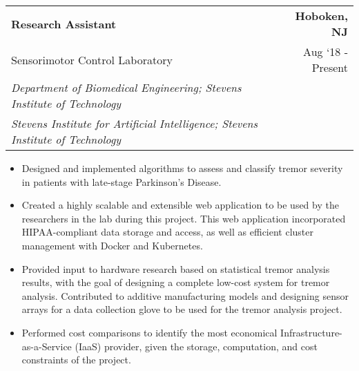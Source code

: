 \documentclass[10pt, letterpaper]{article}
\newcommand{\tabularxwidth}{\textwidth}
\begin{document}
    
    \begin{minipage}{\tabularxwidth}

        \begin{tabularx}{\tabularxwidth}{X r}
            \textbf{Research Assistant} & \textbf{Hoboken, 
        NJ} \\
            Sensorimotor Control Laboratory & 
        
    Aug ‘18 - Present \\
            
                
                    \textit{Department of Biomedical Engineering; Stevens Institute of Technology} & \\
                
                    \textit{Stevens Institute for Artificial Intelligence; Stevens Institute of Technology} & \\
                
            
            
        \end{tabularx}

        \begin{itemize}[noitemsep, topsep=3pt, parsep=0pt, partopsep=0pt]
            
                \item 
    Designed and implemented algorithms to assess and classify tremor severity in patients with late-stage Parkinson's Disease.
            
                \item 
    Created a highly scalable and extensible web application to be used by the researchers in the lab during this project. This web application incorporated HIPAA-compliant data storage and access, as well as efficient cluster management with Docker and Kubernetes.
            
                \item 
    Provided input to hardware research based on statistical tremor analysis results, with the goal of designing a complete low-cost system for tremor analysis. Contributed to additive manufacturing models and designing sensor arrays for a data collection glove to be used for the tremor analysis project.
            
                \item 
    Performed cost comparisons to identify the most economical Infrastructure-as-a-Service (IaaS) provider, given the storage, computation, and cost constraints of the project.
            
        \end{itemize}

        
            \vspace{.5em}
        

    \end{minipage}
    
\end{document}
